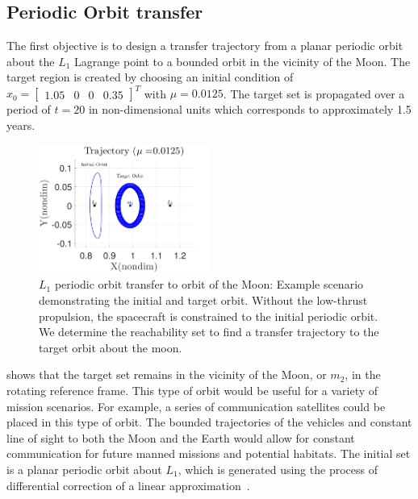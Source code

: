 \documentclass[smallcondensed]{svjour3}
\begin{document}
\subsection{Periodic Orbit transfer}\label{sec:periodic_orbit_transfer}
The first objective is to design a transfer trajectory from a planar periodic orbit about the \( L_1\) Lagrange point to a bounded orbit in the vicinity of the Moon.
The target region is created by choosing an initial condition of \( x_0 = \begin{bmatrix}1.05 & 0 & 0 & 0.35 \end{bmatrix}^T \) with \( \mu = 0.0125 \).
The target set is propagated over a period of \( t = \num{20} \) in non-dimensional units which corresponds to approximately \num{1.5} years.
\begin{figure}[htbp]
   \centering
   \includegraphics[width=0.5\textwidth]{moon_orbit} %
   \caption{\(L_1\) periodic orbit transfer to orbit of the Moon: Example scenario demonstrating the initial and target orbit.
   Without the low-thrust propulsion, the spacecraft is constrained to the initial periodic orbit. 
   We determine the reachability set to find a transfer trajectory to the target orbit about the moon.}
   \label{fig:moon_orbit}
\end{figure}
 shows that the target set remains in the vicinity of the Moon, or \( m_2\), in the rotating reference frame. 
This type of orbit would be useful for a variety of mission scenarios.
For example, a series of communication satellites could be placed in this type of orbit. 
The bounded trajectories of the vehicles and constant line of sight to both the Moon and the Earth would allow for constant communication for future manned missions and potential habitats.
The initial set is a planar periodic orbit about \( L_1\), which is generated using the process of differential correction of a linear approximation~\cite{koon2011}.
\end{document}
